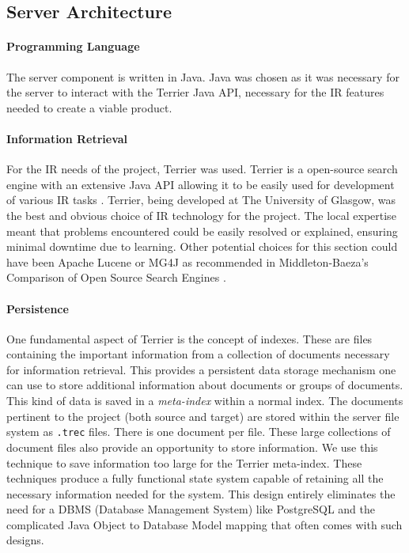 \documentclass{l4proj}
\newcommand{\code}[1]{\texttt{#1}}
\begin{document}
\subsection{Server Architecture}
\paragraph{Programming Language}
The server component is written in Java. Java was chosen as it was necessary for the server to interact with the Terrier Java API, necessary for the IR features needed to create a viable product.
\paragraph{Information Retrieval}
For the IR needs of the project, Terrier was used. Terrier is a open-source search engine with an extensive Java API allowing it to be easily used for development of various IR tasks \cite{terrier} \cite{macdonald2012puppy}.
Terrier, being developed at The University of Glasgow, was the best and obvious choice of IR technology for the project. The local expertise meant that problems encountered could be easily resolved or explained, ensuring minimal downtime due to learning.
Other potential choices for this section could have been Apache Lucene or MG4J as recommended in Middleton-Baeza's Comparison of Open Source Search Engines \cite{middleton2007comparison}.

\paragraph{Persistence}
One fundamental aspect of Terrier is the concept of indexes. These are files containing the important information from a collection of documents necessary for information retrieval. This provides a persistent data storage mechanism one can use to store additional information about documents or groups of documents. This kind of data is saved in a \textit{meta-index} within a normal index.
The documents pertinent to the project (both source and target) are stored within the server file system as \code{.trec} files. There is one document per file.
These large collections of document files also provide an opportunity to store information. We use this technique to save information too large for the Terrier meta-index.
These techniques produce a fully functional state system capable of retaining all the necessary information needed for the system.
This design entirely eliminates the need for a DBMS (Database Management System) like PostgreSQL and the complicated Java Object to Database Model mapping that often comes with such designs.
\end{document}

